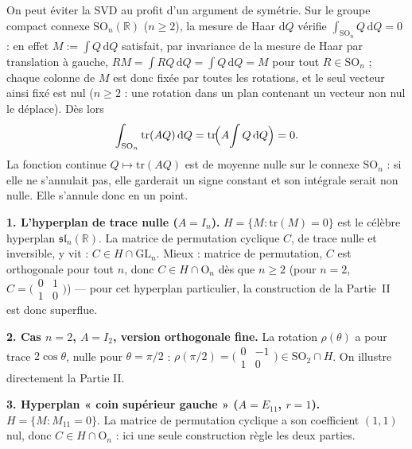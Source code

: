 On peut éviter la SVD au profit d'un argument de symétrie. Sur le groupe
compact connexe $\mathrm{SO}_n(\mathbb{R})$ ($n\geq 2$), la mesure de Haar
$\mathrm{d}Q$ vérifie $\int_{\mathrm{SO}_n} Q\,\mathrm{d}Q = 0$ : en effet
$M := \int Q\,\mathrm{d}Q$ satisfait, par invariance de la mesure de Haar par
translation à gauche, $RM = \int RQ\,\mathrm{d}Q = \int Q\,\mathrm{d}Q = M$ pour
tout $R\in\mathrm{SO}_n$ ; chaque colonne de $M$ est donc fixée par toutes les
rotations, et le seul vecteur ainsi fixé est nul ($n\geq 2$ : une rotation dans
un plan contenant un vecteur non nul le déplace). Dès lors
\[
  \int_{\mathrm{SO}_n} \mathrm{tr}(AQ)\,\mathrm{d}Q = \mathrm{tr}\!\Bigl(A\!\int Q\,\mathrm{d}Q\Bigr) = 0.
\]
La fonction continue $Q\mapsto\mathrm{tr}(AQ)$ est de moyenne nulle sur le
connexe $\mathrm{SO}_n$ : si elle ne s'annulait pas, elle garderait un signe
constant et son intégrale serait non nulle. Elle s'annule donc en un point.

\decsep{}



\begin{mdframed}[style=exbar]
  \textbf{1. L'hyperplan de trace nulle ($A = I_n$).}\enspace%
  $H = \{M : \mathrm{tr}(M) = 0\}$ est le célèbre hyperplan
  $\mathfrak{sl}_n(\mathbb{R})$. La matrice de permutation cyclique $C$, de
  trace nulle et inversible, y vit : $C \in H \cap \mathrm{GL}_n$. Mieux :
  matrice de permutation, $C$ est orthogonale pour tout $n$, donc
  $C \in H \cap \mathrm{O}_n$ dès que $n \geq 2$ (pour $n=2$,
  $C = \bigl(\begin{smallmatrix}0&1\\1&0\end{smallmatrix}\bigr)$) — pour cet
  hyperplan particulier, la construction de la Partie~II est donc superflue.

  \smallskip\noindent
  \textbf{2. Cas $n=2$, $A = I_2$, version orthogonale fine.}\enspace%
  La rotation $\rho(\theta)$ a pour trace $2\cos\theta$, nulle pour
  $\theta = \pi/2$ : $\rho(\pi/2) = \bigl(\begin{smallmatrix}0&-1\\1&0\end{smallmatrix}\bigr)
  \in \mathrm{SO}_2 \cap H$. On illustre directement la Partie II.

  \smallskip\noindent
  \textbf{3. Hyperplan « coin supérieur gauche » ($A = E_{11}$, $r=1$).}\enspace%
  $H = \{M : M_{11} = 0\}$. La matrice de permutation cyclique a son coefficient
  $(1,1)$ nul, donc $C \in H \cap \mathrm{O}_n$ : ici une seule construction
  règle les deux parties.
\end{mdframed}

